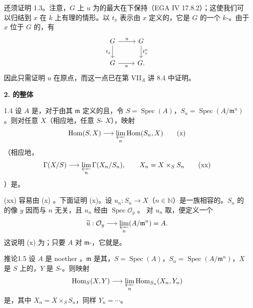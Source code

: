 还须证明 1.3。注意，$G$ 上 $u$ 为的最大在下保持（EGA IV 17.8.2）；这使我们可以归结到 $x$ 在 $k$ 上有理的情形。以 $t_x$ 表示由 $x$ 定义的，它是 $G$ 的一个 $k$-。由于 $x$ 位于 $G$ 的，有
\[
\begin{tikzcd}
G\arrow[r,"u"]\arrow[d,"t_x"']&G\arrow[d,"t_x^n"]\\
G\arrow[r,"u"']&G.
\end{tikzcd}
\]
因此只需证明 $u$ 在原点，而这一点已在第 VII$_A$ 讲 8.4 中证明。

\textbf{2. 的整体}
\begin{SGAresult}{}{1.4}
设 $A$ 是，对于由其 $\mathfrak m$ 定义的且，令 $S=\operatorname{Spec}(A)$，$S_n=\operatorname{Spec}(A/\mathfrak m^n)$。则对任意 $X$（相应地，任意 $S$- $X$），映射
\[\operatorname{Hom}(S,X)\longrightarrow\varprojlim_n\operatorname{Hom}(S_n,X)\tag{x}\]
（相应地，
\[\Gamma(X/S)\longrightarrow\varprojlim_n\Gamma(X_n/S_n),\qquad X_n=X\times_S S_n\tag{xx}\]
）是。
\end{SGAresult}
(xx) 容易由 (x) 。下面证明 (x)。设 $u_n:S_n\to X$（$n\in\mathbb N$）是一族相容的。$S_n$ 的的像 $y$ 因而与 $n$ 无关，且 $u_n$ 经由 $\operatorname{Spec}\mathcal O_y$ 。
对 $u_n$ 取，便定义一个
\[\widetilde u:\mathcal O_y\longrightarrow\varprojlim_n(A/\mathfrak m^n)=A.\]
这说明 (x) 为；只要 $A$ 对 $\mathfrak m$-，它就是。
\begin{SGAresult}{推论}{1.5}
设 $A$ 是 noether ，$\mathfrak m$ 是其，$S=\operatorname{Spec}(A)$，$S_n=\operatorname{Spec}(A/\mathfrak m^n)$，$X$ 是 $S$ 上的，$Y$ 是 $S$-。则映射
\[\operatorname{Hom}_S(X,Y)\longrightarrow\varprojlim_n\operatorname{Hom}_{S_n}(X_n,Y_n)\]
是，其中 $X_n=X\times_S S_n$，同样 $Y_n=\cdots$。
\end{SGAresult}

